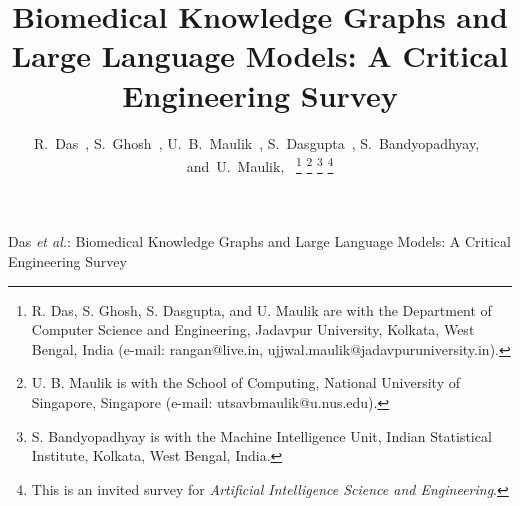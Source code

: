 \documentclass[journal]{IEEEtran}
\begin{document}
\title{Biomedical Knowledge Graphs and Large Language Models: A Critical Engineering Survey}

\author{R.~Das~,
        S.~Ghosh~,
        U.~B.~Maulik~,
        S.~Dasgupta~,
        S.~Bandyopadhyay,~
        and~U.~Maulik,~%
\thanks{R. Das, S. Ghosh, S. Dasgupta, and U. Maulik are with the Department of Computer Science and Engineering, Jadavpur University, Kolkata, West Bengal, India (e-mail: rangan@live.in, ujjwal.maulik@jadavpuruniversity.in).}%
\thanks{U. B. Maulik is with the School of Computing, National University of Singapore, Singapore (e-mail: utsavbmaulik@u.nus.edu).}%
\thanks{S. Bandyopadhyay is with the Machine Intelligence Unit, Indian Statistical Institute, Kolkata, West Bengal, India.}%
\thanks{This is an invited survey for \emph{Artificial Intelligence Science and Engineering}.}}

%
{Das \MakeLowercase{\textit{et al.}}: Biomedical Knowledge Graphs and Large Language Models: A Critical Engineering Survey}

\maketitle


















\balance
\printbibliography


\end{document}
